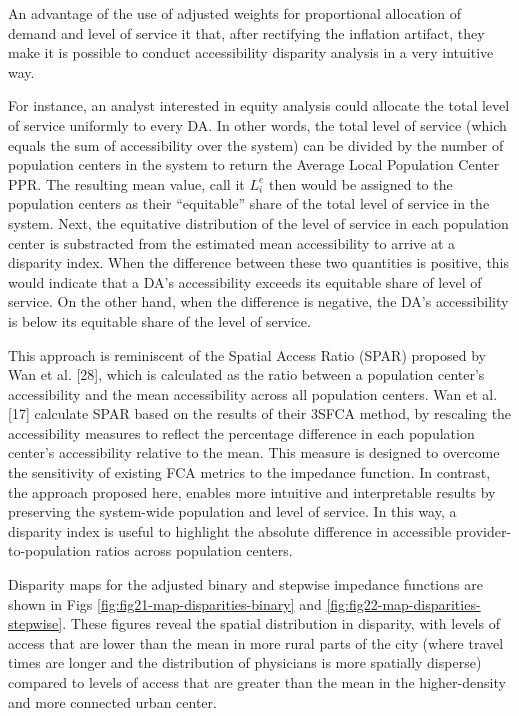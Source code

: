 \documentclass[10pt,letterpaper]{article}
\begin{document}
An advantage of the use of adjusted weights for proportional allocation
of demand and level of service it that, after rectifying the inflation
artifact, they make it is possible to conduct accessibility disparity
analysis in a very intuitive way.

For instance, an analyst interested in equity analysis could allocate
the total level of service uniformly to every DA. In other words, the
total level of service (which equals the sum of accessibility over the
system) can be divided by the number of population centers in the system
to return the Average Local Population Center PPR. The resulting mean
value, call it \(L_i^e\) then would be assigned to the population
centers as their ``equitable'' share of the total level of service in
the system. Next, the equitative distribution of the level of service in
each population center is substracted from the estimated mean
accessibility to arrive at a disparity index. When the difference
between these two quantities is positive, this would indicate that a
DA's accessibility exceeds its equitable share of level of service. On
the other hand, when the difference is negative, the DA's accessibility
is below its equitable share of the level of service.

This approach is reminiscent of the Spatial Access Ratio (SPAR) proposed
by Wan et al. {[}28{]}, which is calculated as the ratio between a
population center's accessibility and the mean accessibility across all
population centers. Wan et al. {[}17{]} calculate SPAR based on the
results of their 3SFCA method, by rescaling the accessibility measures
to reflect the percentage difference in each population center's
accessibility relative to the mean. This measure is designed to overcome
the sensitivity of existing FCA metrics to the impedance function. In
contrast, the approach proposed here, enables more intuitive and
interpretable results by preserving the system-wide population and level
of service. In this way, a disparity index is useful to highlight the
absolute difference in accessible provider-to-population ratios across
population centers.

Disparity maps for the adjusted binary and stepwise impedance functions
are shown in Figs \ref{fig:fig21-map-disparities-binary} and
\ref{fig:fig22-map-disparities-stepwise}. These figures reveal the
spatial distribution in disparity, with levels of access that are lower
than the mean in more rural parts of the city (where travel times are
longer and the distribution of physicians is more spatially disperse)
compared to levels of access that are greater than the mean in the
higher-density and more connected urban center.
\end{document}
